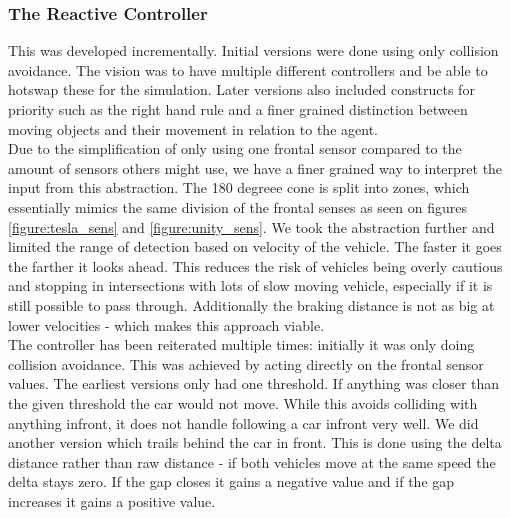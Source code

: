 \subsubsection{The Reactive Controller}
This was developed incrementally. Initial versions were done using only collision avoidance.
The vision was to have multiple different controllers and be able to hotswap these for the simulation.
Later versions also included constructs for priority such as the right hand rule and a finer grained distinction between moving objects and their movement in relation to the agent.\\

Due to the simplification of only using one frontal sensor compared to the amount of sensors others might use, we have a finer grained way to interpret the input from this abstraction.
The 180 degreee cone is split into zones, which essentially mimics the same division of the frontal senses as seen on figures \ref{figure:tesla_sens} and \ref{figure:unity_sens}.
We took the abstraction further and limited the range of detection based on velocity of the vehicle. The faster it goes the farther it looks ahead.
This reduces the risk of vehicles being overly cautious and stopping in intersections with lots of slow moving vehicle, especially if it is still possible to pass through.
Additionally the braking distance is not as big at lower velocities - which makes this approach viable.\\

The controller has been reiterated multiple times: initially it was only doing collision avoidance.
This was achieved by acting directly on the frontal sensor values.
The earliest versions only had one threshold. If anything was closer than the given threshold the car would not move.
While this avoids colliding with anything infront, it does not handle following a car infront very well.
We did another version which trails behind the car in front.
This is done using the delta distance rather than raw distance - if both vehicles move at the same speed the delta stays zero.
If the gap closes it gains a negative value and if the gap increases it gains a positive value.
